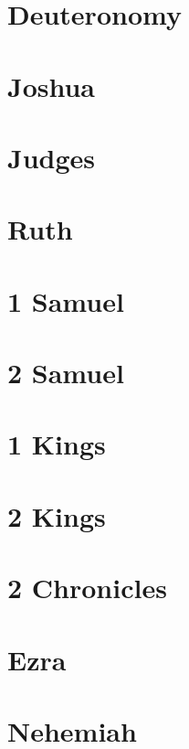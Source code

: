 \documentclass[twoside]{book}
\newcommand\englishchaptertitle{}
\newcommand\hebrewchaptertitle{}
\newcommand\book[2]{%
    \chapter[#1\hfill#2~~~]{#1}%
    \renewcommand\englishchaptertitle{#1}%
    \renewcommand\hebrewchaptertitle{#2}%
    \thispagestyle{empty}%
}
\newcommand\Hebrew[1]{{\sblh #1}}
\begin{document}
    
    
    
    
    
    
    
    
    \book{Deuteronomy}{\Hebrew{דברים}}
    
    
    
    
    
    
    \book{Joshua}{\Hebrew{יהושע}}
    
    
    \book{Judges}{\Hebrew{שופטים}}
    
    
    \book{Ruth}{\Hebrew{רות}}
    
    
    
    
    
    
    
    
    \book{1 Samuel}{\Hebrew{א שמואל}}
    
    
    \book{2 Samuel}{\Hebrew{ב שמואל}}
    
    
    \book{1 Kings}{\Hebrew{א מלכים}}
    
    
    
    
    \book{2 Kings}{\Hebrew{ב מלכים}}
    
    
    
    
    
    
    \book{2 Chronicles}{\Hebrew{ב הימים דברי}}
    
    
    
    
    \book{Ezra}{\Hebrew{עזרא}}
    
    
    
    
    
    
    
    
    \book{Nehemiah}{\Hebrew{נחמיה}}
    
    
    
\end{document}
